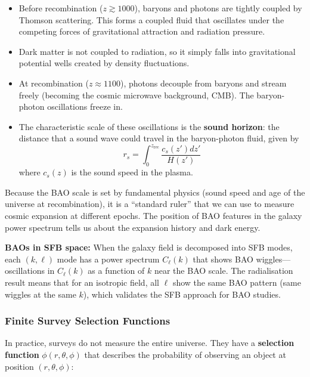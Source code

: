 \begin{itemize}
    \item Before recombination ($z \gtrsim 1000$), baryons and photons are tightly coupled by Thomson scattering. This forms a coupled fluid that oscillates under the competing forces of gravitational attraction and radiation pressure.
    
    \item Dark matter is not coupled to radiation, so it simply falls into gravitational potential wells created by density fluctuations.
    
    \item At recombination ($z \approx 1100$), photons decouple from baryons and stream freely (becoming the cosmic microwave background, CMB). The baryon-photon oscillations freeze in.
    
    \item The characteristic scale of these oscillations is the \textbf{sound horizon}: the distance that a sound wave could travel in the baryon-photon fluid, given by
    \begin{equation}
    r_s = \int_0^{z_{\text{rec}}} \frac{c_s(z') dz'}{H(z')}
    \end{equation}
    where $c_s(z)$ is the sound speed in the plasma.
\end{itemize}

Because the BAO scale is set by fundamental physics (sound speed and age of the universe at recombination), it is a ``standard ruler'' that we can use to measure cosmic expansion at different epochs. The position of BAO features in the galaxy power spectrum tells us about the expansion history and dark energy.

\textbf{BAOs in SFB space:} When the galaxy field is decomposed into SFB modes, each $(k, \ell)$ mode has a power spectrum $C_\ell(k)$ that shows BAO wiggles—oscillations in $C_\ell(k)$ as a function of $k$ near the BAO scale. The radialisation result means that for an isotropic field, all $\ell$ show the same BAO pattern (same wiggles at the same $k$), which validates the SFB approach for BAO studies.

\subsubsection{Finite Survey Selection Functions}

In practice, surveys do not measure the entire universe. They have a \textbf{selection function} $\phi(r, \theta, \phi)$ that describes the probability of observing an object at position $(r, \theta, \phi)$:


